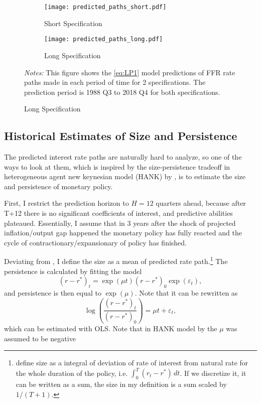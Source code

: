 \documentclass[11pt]{article}
\begin{document}
\begin{figure}[!htbp]\centering
  \begin{minipage}{1\textwidth}\centering
    \caption{Predictions of FFR Paths Made in Each of the Period.} 
    \label{fig:pathes_predictions}
    \vspace{2ex}
    \begin{subfigure}[b]{0.495\textwidth}\centering
      \caption{Short Specification}
      \label{fig:pathes_predictions_short}
      \texttt{[image: predicted\_paths\_short.pdf]}
    \end{subfigure}\hfill
    \begin{subfigure}[b]{0.495\textwidth}\centering
      \caption{Long Specification}
      \label{fig:pathes_predictions_long}
      \texttt{[image: predicted\_paths\_long.pdf]}
    \end{subfigure}
    {\begin{flushleft}
      \scriptsize \textit{Notes:} This figure shows the \vref{eq:LP1} model predictions of FFR rate paths made in each period of time for 2 specifications. The prediction period is 1988 Q3 to 2018 Q4 for both specifications.
    \end{flushleft}} 
    \end{minipage}

\end{figure}


\subsection{Historical Estimates of Size and Persistence}
\label{sec:size_persistence}


The predicted interest rate paths are naturally hard to analyze, so one of the ways to look at them, which is inspired by the size-persistence tradeoff in heterogeneous agent new keynesian model (HANK) by \citet{KMV2018}, is to estimate the size and persistence of monetary policy. 

First, I restrict the prediction horizon to $H=12$ quarters ahead, because after T+12 there is no significant coefficients of interest, and predictive abilities plateaued. 
Essentially, I assume that in 3 years after the shock of projected inflation/output gap happened the monetary policy has fully reacted and the cycle of contractionary/expansionary of policy has finished.

Deviating from \citet{KMV2018}, I define the size as a mean of predicted rate path.\footnote{\citet{KMV2018} define size as a integral of deviation of rate of interest from natural rate for the whole duration of the policy, i.e. $\int_0^T \left(r_t-r^*\right)\,dt$. If we discretize it, it can be written as a sum, the size in my definition is a sum scaled by $1/(T+1)$.} 
The persistence is calculated by fitting the model 
\[\left(r-r^*\right)_t=\exp(\mu t)\left(r-r^*\right)_0\exp(\varepsilon_t),\]
and persistence is then equal to $\exp(\mu)$. Note that it can be rewritten as
\[\log\left(\frac{\left(r-r^*\right)_t}{\left(r-r^*\right)_0}\right)=\mu t+\varepsilon_t,\]
which can be estimated with OLS. 
Note that in HANK model by \citet{KMV2018} the $\mu$ was assumed to be negative
\end{document}
